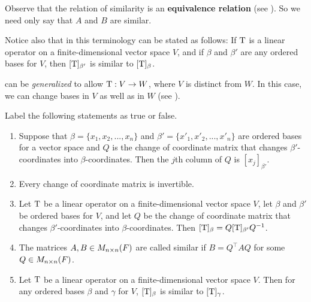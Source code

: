 \begin{remark} \label{remark 2.5.3}
Observe that the relation of similarity is an \textbf{equivalence relation} (see ).
So we need only say that \(A\) and \(B\) are similar.

Notice also that in this terminology  can be stated as follows:
If \(\mathrm{T}\) is a linear operator on a finite-dimensional vector space \(V\), and if \(\beta\) and \(\beta'\) are any ordered bases for \(V\), then \([\mathrm{T}]_{\beta'}\) is similar to \([\mathrm{T}]_{\beta}\).
\end{remark}

\begin{remark} \label{remark 2.5.4}
 can be \emph{generalized} to allow \(\mathrm{T} : V \to W\), where \(V\) is distinct from \(W\).
In this case, we can change bases in \(V\) as well as in \(W\) (see ).
\end{remark}

\exercisesection

\begin{exercise} \label{exercise 2.5.1}
Label the following statements as true or false.
\begin{enumerate}
\item Suppose that \(\beta = \{ x_1, x_2, ..., x_n \}\) and \(\beta' = \{ x'_1, x'_2, ..., x'_n \}\) are ordered bases for a vector space
and \(Q\) is the change of coordinate matrix that changes \(\beta'\)-coordinates into \(\beta\)-coordinates.
Then the \(j\)th column of \(Q\) is \([x_j]_{\beta'}\).

\item Every change of coordinate matrix is invertible. 

\item Let \(\mathrm{T}\) be a linear operator on a finite-dimensional vector space \(V\), let \(\beta\) and \(\beta'\) be ordered bases for \(V\),
and let \(Q\) be the change of coordinate matrix that changes \(\beta'\)-coordinates into \(\beta\)-coordinates.
Then \([\mathrm{T}]_{\beta} = Q [\mathrm{T}]_{\beta'} Q^{-1}\).

\item The matrices \(A, B \in M_{n \times n}(F)\) are called similar if \(B = Q^\top A Q\) for some \(Q \in M_{n \times n}(F)\).

\item Let \(\mathrm{T}\) be a linear operator on a finite-dimensional vector space \(V\).
Then for any ordered bases \(\beta\) and \(\gamma\) for \(V\), \([\mathrm{T}]_{\beta}\) is similar to \([\mathrm{T}]_{\gamma}\).
\end{enumerate}
\end{exercise}

